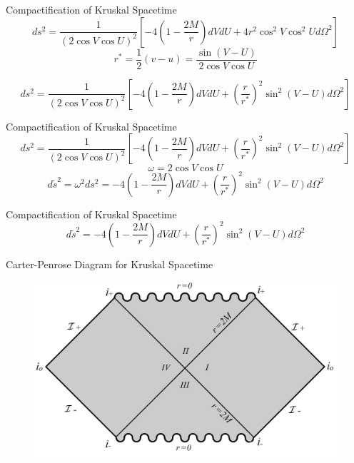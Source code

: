 \documentclass{beamer}
\begin{document}
        \begin{frame}{Compactification of Kruskal Spacetime}
        	$$ ds^2 = \frac{1}{\left(2\cos V\cos U\right)^2}\left[-4\left(1-\frac{2M}{r}\right)dVdU 
            + 4r^2 \cos^2 V\cos^2U d\Omega^2 \right]$$
			\pause
			$$ r^{*} = \frac{1}{2} \left( v - u \right) = 
            \frac{ \sin\left(V-U\right) }{2\cos V\cos U}$$
            \pause
            \bigskip
            
            \small{
            $$ds^{2}=\frac{1}{\left(2\cos V\cos U\right)^{2}}
            \left[-4\left(1-\frac{2M}{r}\right)dVdU
            +\left(\frac{r}{r^{*}}\right)^{2}\sin^{2}\left(V-U\right)d\Omega^{2}\right]$$}
        \end{frame}
        
        \begin{frame}{Compactification of Kruskal Spacetime}
        	\small{
            $$ds^{2}=\frac{1}{\left(2\cos V\cos U\right)^{2}}\left[-4\left(1-\frac{2M}{r}\right)dVdU+\left(\frac{r}{r^{*}}\right)^{2}\sin^{2}\left(V-U\right)d\Omega^{2}\right]$$}
            \pause
            $$\omega=2\cos V\cos U$$
            \pause
            $$d\tilde{s}^{2}=\omega^{2}ds^{2}=-4\left(1-\frac{2M}{r}\right)dVdU+\left(\frac{r}{r^{*}}\right)^{2}\sin^{2}\left(V-U\right)d\Omega^{2}$$
        \end{frame}
        
        \begin{frame}{Compactification of Kruskal Spacetime}
        	$$d\tilde{s}^{2}=-4\left(1-\frac{2M}{r}\right)dVdU+\left(\frac{r}{r^{*}}\right)^{2}\sin^{2}\left(V-U\right)d\Omega^{2}$$
        \end{frame}
        
        \begin{frame}{Carter-Penrose Diagram for Kruskal Spacetime}
        	\begin{center}
				\begin{figure}
				\includegraphics[scale=0.75] {fig17.jpg}
				\end{figure}
			\end{center}	
        \end{frame}
\end{document}
